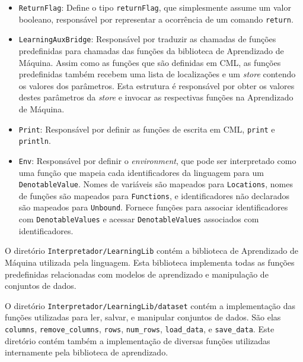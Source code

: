 \documentclass[12pt]{article}
\begin{document}
\begin{itemize}
\item \texttt{ReturnFlag}: Define o tipo \texttt{returnFlag}, que simplesmente assume um valor booleano, responsável por representar a ocorrência de um comando \texttt{return}.

\item \texttt{LearningAuxBridge}: Responsável por traduzir as chamadas de funções predefinidas para chamadas das funções da biblioteca de Aprendizado de Máquina. Assim como as funções que são definidas em CML, as funções predefinidas também recebem uma lista de localizações e um \textit{store} contendo os valores dos parâmetros. Esta estrutura é responsável por obter os valores destes parâmetros da \textit{store} e invocar as respectivas funções na Aprendizado de Máquina.

\item \texttt{Print}: Responsável por definir as funções de escrita em CML, \texttt{print} e \texttt{println}.
 
\item \texttt{Env}: Responsável por definir o \textit{environment}, que pode ser interpretado como uma função que mapeia cada identificadores da linguagem para um \texttt{DenotableValue}. Nomes de variáveis são mapeados para \texttt{Locations}, nomes de funções são mapeados para \texttt{Functions}, e identificadores não declarados são mapeados para \texttt{Unbound}. Fornece funções para associar identificadores com \texttt{DenotableValues} e acessar \texttt{DenotableValues} associados com identificadores.
\end{itemize}

O diretório \texttt{Interpretador/LearningLib} contém a biblioteca de Aprendizado de Máquina utilizada pela linguagem. Esta biblioteca implementa todas as funções predefinidas relacionadas com modelos de aprendizado e manipulação de conjuntos de dados.

O diretório \texttt{Interpretador/LearningLib/dataset} contém a implementação das funções utilizadas para ler, salvar, e manipular conjuntos de dados. São elas \texttt{columns}, \texttt{remove\_columns}, \texttt{rows}, \texttt{num\_rows}, \texttt{load\_data}, e \texttt{save\_data}. Este diretório contém também a implementação de diversas funções utilizadas internamente pela biblioteca de aprendizado.
\end{document}
